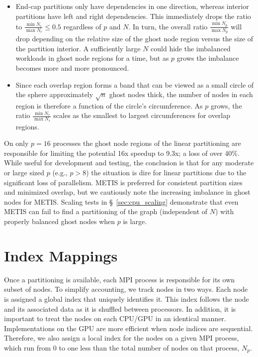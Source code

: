 \documentclass{report}
\begin{document}
\begin{itemize} 
\item End-cap partitions only have dependencies in one direction, whereas interior partitions have left and right dependencies. This immediately drops the ratio to $\frac{\min N_r}{\max N_r} \leq 0.5$ regardless of $p$ and $N$. In turn, the overall ratio $\frac{\min N_p}{\max N_p}$ will drop depending on the relative size of the ghost node region versus the size of the partition interior. A sufficiently large $N$ could hide the imbalanced workloads in ghost node regions for a time, but as $p$ grows the imbalance becomes more and more pronounced. 
\item Since each overlap region forms a band that can be viewed as a small circle of the sphere approximately $\sqrt{n}$ ghost nodes thick, the number of nodes in each region is therefore a function of the circle's circumference. As $p$ grows, the ratio $\frac{\min N_r}{\max N_r}$ scales as the smallest to largest circumferences for overlap regions. 
\end{itemize}
On only $p=16$ processes the ghost node regions of the linear partitioning are responsible for limiting the potential 16x speedup to 9.3x; a loss of over 40\%. 
While useful for development and testing, the conclusion is that for any moderate or large sized $p$ (e.g., $p > 8$) the situation is dire for linear partitions due to the significant loss of parallelism.   
METIS is preferred for consistent partition sizes and minimized overlap, but we cautiously note the increasing imbalance in ghost nodes for METIS. Scaling tests in \S~\ref{sec:cpu_scaling} demonstrate that even METIS can fail to find a partitioning of the graph (independent of $N$) with properly balanced ghost nodes when $p$ is large.  

% 


\section{Index Mappings}

Once a partitioning is available, each MPI process is responsible for its own subset of nodes. 
To simplify accounting, we track nodes in two ways. Each node is assigned
a global index that uniquely identifies it. This index follows the node 
and its associated data as it is shuffled between processors. In addition, 
it is important to treat the nodes on each CPU/GPU in an identical manner. 
Implementations on the GPU are more efficient when node indices
are sequential. Therefore, we also assign a local index for the nodes on 
a given MPI process, which run from 0 to one less than the total number of nodes on that process, $N_p$. 
\end{document}
